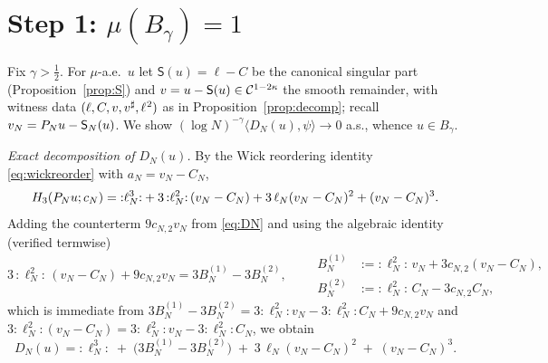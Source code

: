 \section*{Step 1: $\mu(B_\gamma)=1$}

Fix $\gamma>\tfrac12$. For $\mu$-a.e.\ $u$ let $\mathsf S(u)=\ell-C$ be the
canonical singular part (Proposition~\ref{prop:S}) and $v=u-\mathsf S(u)\in
\mathcal{C}^{1-2\kappa}$ the smooth remainder, with witness data
$(\ell,C,v,v^\sharp,\ell^{\hspace{0.5pt}2})$ as in Proposition~\ref{prop:decomp};
recall $v_N=P_N u-\mathsf S_N(u)$. We show
$(\log N)^{-\gamma}\langle D_N(u),\psi\rangle\to0$ a.s., whence $u\in B_\gamma$.

\smallskip
\emph{Exact decomposition of $D_N(u)$.}
By the Wick reordering identity \eqref{eq:wickreorder} with $a_N=v_N-C_N$,
\[
H_3(P_N u;c_N)={:}\ell_N^3{:}+3\,{:}\ell_N^2{:}\,(v_N-C_N)+3\,\ell_N(v_N-C_N)^2+(v_N-C_N)^3 .
\]
Adding the counterterm $9c_{N,2}v_N$ from \eqref{eq:DN} and using the algebraic
identity (verified termwise)
\begin{equation}\label{eq:keyalg}
3\,{:}\ell_N^2{:}\,(v_N-C_N)+9c_{N,2}v_N=3B^{(1)}_N-3B^{(2)}_N ,\qquad
\begin{aligned}
B^{(1)}_N&:={:}\ell_N^2{:}\,v_N+3c_{N,2}(v_N-C_N),\\
B^{(2)}_N&:={:}\ell_N^2{:}\,C_N-3c_{N,2}C_N ,
\end{aligned}
\end{equation}
which is immediate from $3B^{(1)}_N-3B^{(2)}_N
=3{:}\ell_N^2{:}v_N-3{:}\ell_N^2{:}C_N+9c_{N,2}v_N$ and
$3{:}\ell_N^2{:}(v_N-C_N)=3{:}\ell_N^2{:}v_N-3{:}\ell_N^2{:}C_N$, we obtain
\begin{equation}\label{eq:DNsplit}
D_N(u)={:}\ell_N^3{:}\;+\;\bigl(3B^{(1)}_N-3B^{(2)}_N\bigr)\;+\;3\,\ell_N(v_N-C_N)^2\;+\;(v_N-C_N)^3 .
\end{equation}

